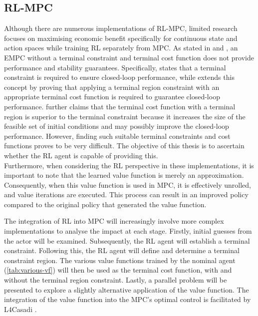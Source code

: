 \subsection{RL-MPC}
Although there are numerous implementations of RL-MPC, limited research focuses on maximising economic benefit specifically for continuous state and action spaces while training RL separately from MPC. As stated in \citet{ellisTutorialReviewEconomic2014} and \citet{amritEconomicOptimizationUsing2011}, an EMPC without a terminal constraint and terminal cost function does not provide performance and stability guarantees. Specifically, \citet{ellisTutorialReviewEconomic2014} states that a terminal constraint is required to ensure closed-loop performance, while \citet{amritEconomicOptimizationUsing2011} extends this concept by proving that applying a terminal region constraint with an appropriate terminal cost function is required to guarantee closed-loop performance.\citet{amritEconomicOptimizationUsing2011} further claims that the terminal cost function with a terminal region is superior to the terminal constraint because it increases the size of the feasible set of initial conditions and may possibly improve the closed-loop performance. However, finding such suitable terminal constraints and cost functions proves to be very difficult. The objective of this thesis is to ascertain whether the RL agent is capable of providing this. \\
Furthermore, when considering the RL perspective in these implementations, it is important to note that the learned value function is merely an approximation. Consequently, when this value function is used in MPC, it is effectively unrolled, and value iterations are executed. This process can result in an improved policy compared to the original policy that generated the value function.

The integration of RL into MPC will increasingly involve more complex implementations to analyse the impact at each stage. Firstly, initial guesses from the actor will be examined. Subsequently, the RL agent will establish a terminal constraint. Following this, the RL agent will define and determine a terminal constraint region. The various value functions trained by the nominal agent (\autoref{tab:various-vf}) will then be used as the terminal cost function, with and without the terminal region constraint. Lastly, a parallel problem will be presented to explore a slightly alternative application of the value function. The integration of the value function into the MPC’s optimal control is facilitated by L4Casadi \cite{}.

